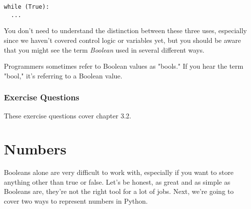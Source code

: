 \begin{lstlisting}[style=pippython]
while (True):
  ...
\end{lstlisting}

You don't need to understand the distinction between these three uses, especially since we haven't covered control logic or variables yet, but you should be aware that you might see the term \textit{Boolean} used in several different ways.\par
Programmers sometimes refer to Boolean values as "bools." If you hear the term "bool," it's referring to a Boolean value.
\subsubsection*{Exercise Questions}
These exercise questions cover chapter 3.2. 
\begin{Exercise}
\end{Exercise}
\begin{Exercise}
\end{Exercise}

\section{Numbers}
Booleans alone are very difficult to work with, especially if you want to store anything other than true or false. Let's be honest, as great and as simple as Booleans are, they're not the right tool for a lot of jobs. Next, we're going to cover two ways to represent numbers in Python.
